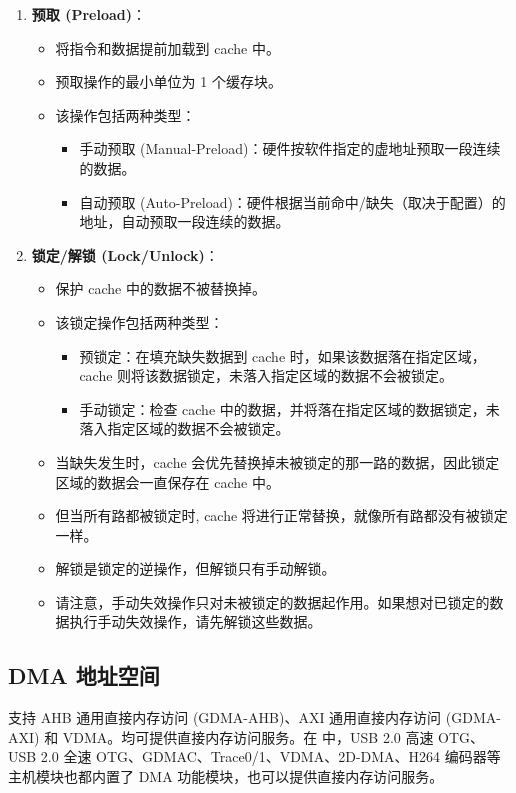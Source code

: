 \documentclass[main\_\_CN.tex]{subfiles}
\begin{document}
\begin{enumerate}
    \item \textbf{预取 (Preload)}：
    \begin{itemize}
        \item 将指令和数据提前加载到 cache 中。
        \item 预取操作的最小单位为 1 个缓存块。
        \item 该操作包括两种类型：
        \begin{itemize}
            \item 手动预取 (Manual-Preload)：硬件按软件指定的虚地址预取一段连续的数据。
            \item 自动预取 (Auto-Preload)：硬件根据当前命中/缺失（取决于配置）的地址，自动预取一段连续的数据。
        \end{itemize}
    \end{itemize}

    \item \textbf{锁定/解锁 (Lock/Unlock)}：
    \begin{itemize}
        \item 保护 cache 中的数据不被替换掉。
        \item 该锁定操作包括两种类型：
        \begin{itemize}
            \item 预锁定：在填充缺失数据到 cache 时，如果该数据落在指定区域，cache 则将该数据锁定，未落入指定区域的数据不会被锁定。
            \item 手动锁定：检查 cache 中的数据，并将落在指定区域的数据锁定，未落入指定区域的数据不会被锁定。
        \end{itemize}
        \item 当缺失发生时，cache 会优先替换掉未被锁定的那一路的数据，因此锁定区域的数据会一直保存在 cache 中。
        \item 但当所有路都被锁定时, cache 将进行正常替换，就像所有路都没有被锁定一样。
        \item 解锁是锁定的逆操作，但解锁只有手动解锁。
        \item 请注意，手动失效操作只对未被锁定的数据起作用。如果想对已锁定的数据执行手动失效操作，请先解锁这些数据。
    \end{itemize}
\end{enumerate}

\subsection{ DMA 地址空间}

\chipname{} 支持 AHB 通用直接内存访问 (GDMA-AHB)、AXI 通用直接内存访问 (GDMA-AXI) 和 VDMA。均可提供直接内存访问服务。在  \chipname{} 中，USB 2.0 高速 OTG、USB 2.0 全速 OTG、GDMAC、Trace0/1、VDMA、2D-DMA、H264 编码器等主机模块也都内置了 DMA 功能模块，也可以提供直接内存访问服务。
\end{document}
